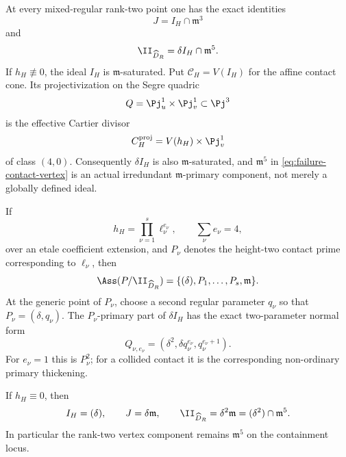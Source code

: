 \begin{theorem}
\label{thm:saturated-contact}
At every mixed-regular rank-two point one has the exact identities
\begin{equation}\label{eq:J-contact-intersection}
 J=I_H\cap\mathfrak m^3
\end{equation}
and
\begin{equation}\label{eq:failure-contact-vertex}
 \II_{\widehat D_R}
 =\delta I_H\cap\mathfrak m^5.
\end{equation}
If \(h_H\not\equiv0\), the ideal \(I_H\) is
\(\mathfrak m\)-saturated.  Put \(\mathcal C_H=V(I_H)\) for the affine contact cone.  Its
projectivization on the Segre quadric
\[
 Q=\Pj^1_u\times\Pj^1_v\subset\Pj^3
\]
is the effective Cartier divisor
\begin{equation}\label{eq:contact-Cartier-divisor}
 C_H^{\mathrm{proj}}=V(h_H)\times\Pj^1_v
\end{equation}
of class \((4,0)\).  Consequently \(\delta I_H\) is also
\(\mathfrak m\)-saturated, and \(\mathfrak m^5\) in
\eqref{eq:failure-contact-vertex} is an actual irredundant
\(\mathfrak m\)-primary component, not merely a globally defined
ideal.

If
\[
 h_H=\prod_{\nu=1}^s\ell_\nu^{e_\nu},
 \qquad \sum_\nu e_\nu=4,
\]
over an etale coefficient extension, and \(P_\nu\) denotes the
height-two contact prime corresponding to \(\ell_\nu\), then
\begin{equation}\label{eq:associated-primes-mixed-regular}
 \Ass(P/\II_{\widehat D_R})
 =
 \{(\delta),P_1,\ldots,P_s,\mathfrak m\}.
\end{equation}
At the generic point of \(P_\nu\), choose a second regular parameter
\(q_\nu\) so that \(P_\nu=(\delta,q_\nu)\).  The
\(P_\nu\)-primary part of \(\delta I_H\) has the exact two-parameter
normal form
\begin{equation}\label{eq:collision-primary-type}
 Q_{\nu,e_\nu}
 =
 (\delta^2,\delta q_\nu^{e_\nu},q_\nu^{e_\nu+1}).
\end{equation}
For \(e_\nu=1\) this is \(P_\nu^2\); for a collided contact it is the
corresponding non-ordinary primary thickening.

If \(h_H\equiv0\), then
\begin{equation}\label{eq:containment-local-ideal}
 I_H=(\delta),\qquad
 J=\delta\mathfrak m,\qquad
 \II_{\widehat D_R}=\delta^2\mathfrak m
                  =(\delta^2)\cap\mathfrak m^5.
\end{equation}
In particular the rank-two vertex component remains
\(\mathfrak m^5\) on the containment locus.
\end{theorem}

